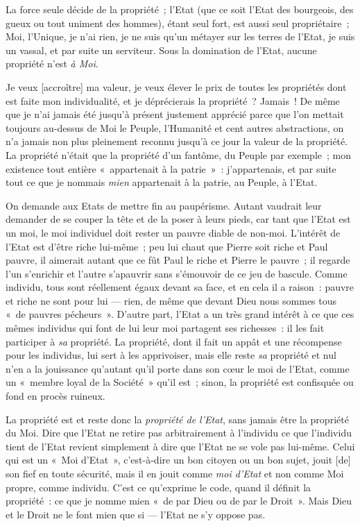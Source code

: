 \documentclass[french,twoside]{book} %
\newcommand\corr[1]{#1}
\begin{document}
La force seule décide de la propriété ; l’Etat (que ce soit l’Etat des bourgeois, des gueux ou tout uniment des hommes), étant seul fort, est aussi seul propriétaire ; Moi, l’Unique, je n’ai rien, je ne suis qu’un métayer sur les terres de l’Etat, je suis un vassal, et par suite un serviteur. Sous la domination de l’Etat, aucune propriété n’est \emph{à Moi}.\par
Je veux [{\corr accroître}] ma valeur, je veux élever le prix de toutes les propriétés dont est faite mon individualité, et je déprécierais la propriété ? Jamais ! De même que je n’ai jamais été jusqu’à présent justement apprécié parce que l’on mettait toujours au-dessus de Moi le Peuple, l’Humanité et cent autres abstractions, on n’a jamais non plus pleinement reconnu jusqu’à ce jour la valeur de la propriété. La propriété n’était que la propriété d’un fantôme, du Peuple par exemple ; mon existence tout entière « appartenait à la patrie » : j’appartenais, et par suite tout ce que je nommais \emph{mien }appartenait à la patrie, au Peuple, à l’Etat.\par
On demande aux Etats de mettre fin au paupérisme. Autant vaudrait leur demander de se couper la tête et de la poser à leurs pieds, car tant que l’Etat est un moi, le moi individuel doit rester un pauvre diable de non-moi. L’intérêt de l’Etat est d’être riche lui-même ; peu lui chaut que Pierre soit riche et Paul pauvre, il aimerait autant que ce fût Paul le riche et Pierre le pauvre ; il regarde l’un s’enrichir et l’autre s’apauvrir sans s’émouvoir de ce jeu de bascule. Comme individu, tous sont réellement égaux devant sa face, et en cela il a raison : pauvre et riche ne sont pour lui — rien, de même  que devant Dieu nous sommes tous « de pauvres pécheurs ». D’autre part, l’Etat a un très grand intérêt à ce que ces mêmes individus qui font de lui leur moi partagent ses richesses : il les fait participer à \emph{sa }propriété. La propriété, dont il fait un appât et une récompense pour les individus, lui sert à les apprivoiser, mais elle reste \emph{sa} propriété et nul n’en a la jouissance qu’autant qu’il porte dans son cœur le moi de l’Etat, comme un « membre loyal de la Société » qu’il est ; sinon, la propriété est confisquée ou fond en procès ruineux.\par
La propriété est et reste donc la \emph{propriété de l’Etat}, sans jamais être la propriété du Moi. Dire que l’Etat ne retire pas arbitrairement à l’individu ce que l’individu tient de l’Etat revient simplement à dire que l’Etat ne se vole pas lui-même. Celui qui est un « Moi d’Etat », c’est-à-dire un bon citoyen ou un bon sujet, jouit [{\corr de}] son fief en toute sécurité, mais il en jouit comme \emph{moi d’Etat} et non comme Moi propre, comme individu. C’est ce qu’exprime le code, quand il définit la propriété : ce que je nomme mien « de par Dieu ou de par le Droit ». Mais Dieu et le Droit ne le font mien que si — l’Etat ne s’y oppose pas.\par
\end{document}
